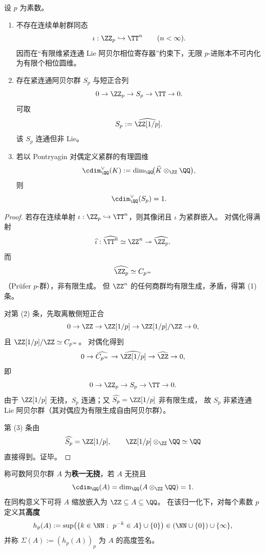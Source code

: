 \begin{theorem}\label{thm:conclusion-lie-solenoid-prime-ledger-dichotomy}
设 \(p\) 为素数。
\begin{enumerate}
  \item 不存在连续单射群同态
  \[
  \iota:\ZZ_p\hookrightarrow \TT^n\qquad(n<\infty).
  \]
  因而在“有限维紧连通 Lie 阿贝尔相位寄存器”约束下，无限 \(p\)-进账本不可内化为有限个相位圆维。
  \item 存在紧连通阿贝尔群 \(S_p\) 与短正合列
  \[
  0\to \ZZ_p\to S_p\to \TT\to 0.
  \]
  可取
  \[
  S_p:=\widehat{\ZZ[1/p]}.
  \]
  该 \(S_p\) 连通但非 Lie。
  \item 若以 Pontryagin 对偶定义紧群的有理圆维
  \[
  \cdim_{\QQ}^{\vee}(K):=\dim_{\QQ}\!\bigl(\widehat K\otimes_{\ZZ}\QQ\bigr),
  \]
  则
  \[
  \cdim_{\QQ}^{\vee}(S_p)=1.
  \]
\end{enumerate}
\end{theorem}
\begin{proof}
若存在连续单射 \(\iota:\ZZ_p\hookrightarrow \TT^n\)，则其像闭且 \(\iota\) 为紧群嵌入。
对偶化得满射
\[
\widehat\iota:\widehat{\TT^n}\simeq \ZZ^n\twoheadrightarrow \widehat{\ZZ_p}.
\]
而
\[
\widehat{\ZZ_p}\simeq C_{p^\infty}
\]
（Pr\"ufer \(p\)-群），非有限生成。
但 \(\ZZ^n\) 的任何商群均有限生成，矛盾，得第 (1) 条。

对第 (2) 条，先取离散侧短正合
\[
0\to \ZZ\to \ZZ[1/p]\to \ZZ[1/p]/\ZZ\to 0,
\]
且 \(\ZZ[1/p]/\ZZ\simeq C_{p^\infty}\)。
对偶化得到
\[
0\to \widehat{C_{p^\infty}}\to \widehat{\ZZ[1/p]}\to \widehat{\ZZ}\to 0,
\]
即
\[
0\to \ZZ_p\to S_p\to \TT\to 0.
\]
由于 \(\ZZ[1/p]\) 无挠，\(S_p\) 连通；又 \(\widehat{S_p}=\ZZ[1/p]\) 非有限生成，
故 \(S_p\) 非紧连通 Lie 阿贝尔群（其对偶应为有限生成自由阿贝尔群）。

第 (3) 条由
\[
\widehat{S_p}=\ZZ[1/p],\qquad
\ZZ[1/p]\otimes_{\ZZ}\QQ\simeq \QQ
\]
直接得到。证毕。
\end{proof}

\begin{definition}[秩一无挠群的高度签名]\label{def:conclusion-rank1-height-signature}
称可数阿贝尔群 \(A\) 为\textbf{秩一无挠}，若 \(A\) 无挠且
\[
\cdim_{\QQ}(A)=\dim_{\QQ}(A\otimes_{\ZZ}\QQ)=1.
\]
在同构意义下可将 \(A\) 缩放嵌入为
\(
\ZZ\subseteq A\subseteq \QQ
\)。
在该归一化下，对每个素数 \(p\) 定义其\textbf{高度}
\[
h_p(A):=\sup\bigl(\{k\in\NN:\ p^{-k}\in A\}\cup\{0\}\bigr)\in(\NN\cup\{0\})\cup\{\infty\},
\]
并称 \(\Sigma(A):=(h_p(A))_{p}\) 为 \(A\) 的高度签名。
\end{definition}

